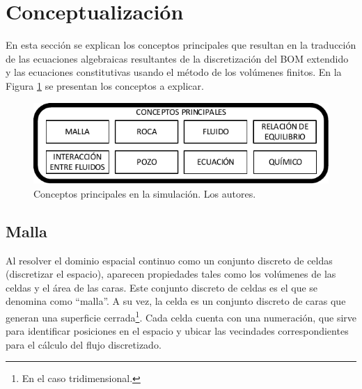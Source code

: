 \section{Conceptualización}\label{sec:Concepts}
En esta sección se explican los conceptos principales que resultan en la traducción de las ecuaciones algebraicas resultantes de la discretización del BOM extendido y las ecuaciones constitutivas usando el método de los volúmenes finitos. En la Figura \ref{fig:Concepts} se presentan los conceptos a explicar.

\begin{figure}[h]
	\centering%
	\includegraphics[width=0.9\linewidth]{Fig/Conceptos.pdf}%
	\caption[Conceptos principales en la simulación.]{Conceptos principales en la simulación. Los autores.} \label{fig:Concepts}
\end{figure}

\subsection{Malla}\label{subsec:PS_Mesh}
Al resolver el dominio espacial continuo como un conjunto discreto de celdas (discretizar el espacio), aparecen propiedades tales como los volúmenes de las celdas y el área de las caras. Este conjunto discreto de celdas es el que se denomina como ``malla''. A su vez, la celda es un conjunto discreto de caras que generan una superficie cerrada\footnote{En el caso tridimensional.}. Cada celda cuenta con una numeración, que sirve para identificar posiciones en el espacio y ubicar las vecindades correspondientes para el cálculo del flujo discretizado.\\

